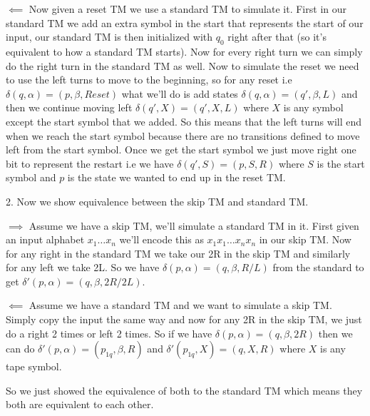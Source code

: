 \documentclass[11pt]{article}
\begin{document}
\begin{enumerate}
\begin{answer}
    $\impliedby$ Now given a reset TM we use a standard TM to simulate it. First in our standard TM we add an extra symbol in the start that represents the start of our input, our standard TM is then initialized with $q_{0}$ right after that (so it's equivalent to how a standard TM starts). Now for every right turn we can simply do the right turn in the standard TM as well. Now to simulate the reset we need to use the left turns to move to the  beginning, so for any reset i.e $\delta(q, \alpha) = (p, \beta, Reset)$ what we'll do is add states $\delta(q, \alpha) = (q', \beta, L)$ and then we continue moving left $\delta(q', X) = (q', X, L)$ where $X$ is any symbol except the start symbol that we added. So this means that the left turns will end when we reach the start symbol because there are no transitions defined to move left from the start symbol. Once we get the start symbol we just move right one bit to represent the restart i.e we have $\delta(q', S) = (p, S, R)$ where $S$ is the start symbol and $p$ is the state we wanted to end up in the reset TM.


    \vspace{1em}
    
    2. Now we show equivalence between the skip TM and standard TM. 
    \vspace{1em}
    
    $\implies$ Assume we have a skip TM, we'll simulate a standard TM in it. First given an input alphabet $x_{1} \dots x_n$ we'll encode this as $x_{1}x_{1} \dots x_n x_n$ in our skip TM. Now for any right in the standard TM we take our 2R in the skip TM and similarly for any left we take 2L. So we have $\delta(p, \alpha) = (q, \beta, R  / L)$ from the standard to get $\delta'(p, \alpha) = (q, \beta, 2R / 2L)$. 
    \vspace{1em}
    
    $\impliedby$ Assume we have a standard TM and we want to simulate a skip TM. Simply copy the input the same way and now for any 2R in the skip TM, we just do a right 2 times or left 2 times. So if we have $\delta(p, \alpha) = (q, \beta,  2R)$ then we can do $\delta'(p, \alpha) = (p_{1q}, \beta, R)$ and $\delta'(p_{1q}, X) = (q, X, R)$ where $X$ is any tape symbol.

    \vspace{1em}
    
    So we just showed the equivalence of both to the standard TM which means they both are equivalent to each other.
\end{answer}



\end{enumerate}
\end{document}
